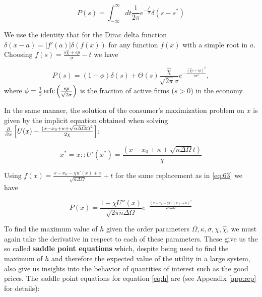\begin{equation}
  \label{eq:64}
  P(s) = \int_{-\infty}^\infty dt \frac{1}{2\pi}
  e^{-\frac{t^2}{2}} \delta (s - s^*)
\end{equation}

We use the identity that for the Dirac delta function $\delta(x - a) = |f'(a)|\delta(f(x))$ for any function $f(x)$ with a simple root in $a$. Choosing $f(s) = \frac{s\hat{\chi} + \epsilon p}{\sigma} - t$ we have

\begin{equation}
  \label{eq:63}
  P(s) = (1 - \phi) \delta(s) + \Theta(s) \frac{\hat{\chi}}{\sqrt{2\pi}
    \sigma} e^{-\frac{(\hat{\chi}s + \epsilon p)^2}{2\sigma^2}},
\end{equation}
where $\phi = \frac{1}{2} \operatorname{erfc}\left(\frac{\epsilon p}{\sqrt{2} \sigma}\right)$ is the fraction of active firms ($s > 0$) in the economy.
    
In the same manner, the solution of the consumer's maximization problem on $x$ is given by the implicit equation obtained when solving $\frac{\partial}{\partial x} \left[U(x) - \frac{(x - x_0 + \kappa + \sqrt{n\Delta\Omega}t)^2}{2\chi}\right]$:

  \begin{equation}
    \label{eq:x_ast}
    x^* = x : : U'(x^*) = \frac{(x - x_0 + \kappa +
      \sqrt{n\Delta\Omega}t)}{\chi}
  \end{equation}

Using $f(x) = \frac{x - x_0 - \chi u'(x) + \kappa}{\sqrt{n \Delta \Omega}} + t$ for the same replacement as in \eqref{eq:63} we have

\begin{equation}
  \label{eq:66}
  P(x) = \frac{1 - \chi U''(x)}{\sqrt{2\pi n \Delta \Omega}} e^{-
    \frac{(x - x_0 - \chi U'(x) + \kappa)^2}{2n\Delta \Omega}}
\end{equation}

To find the maximum value of $h$ given the order parameters $\Omega, \kappa,
  \sigma, \chi, \hat{\chi}$, we must again take the derivative in respect to each of these parameters. These give us the so called \textbf{saddle point equations} which, despite being used to find the maximum of $h$ and therefore the expected value of the utility in a large system, also give us insights into the behavior of quantities of interest such as the good prices. The saddle point equations for equation \eqref{eq:h} are (see Appendix \ref{app:rep} for details):

